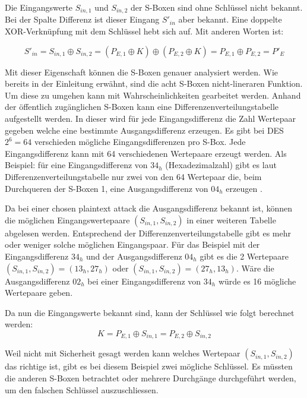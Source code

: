 Die Eingangswerte $S_{in,1}$ und $S_{in,2}$ der S-Boxen sind ohne Schlüssel nicht bekannt. Bei der Spalte \glqq Differenz\grqq{} ist dieser Eingang $S'_{in}$ aber bekannt. Eine doppelte XOR-Verknüpfung mit dem Schlüssel hebt sich auf. Mit anderen Worten ist: 

\begin{equation}\label{equ:Schluessel_Differenz}
S'_{in} = S_{in,1} \oplus S_{in,2} = (P_{E,1} \oplus K) \oplus (P_{E,2} \oplus K) = P_{E,1} \oplus P_{E,2} = P'_{E} 
\end{equation}


Mit dieser Eigenschaft können die S-Boxen genauer analysiert werden. 
Wie bereits in der Einleitung erwähnt, sind die acht S-Boxen nicht-lineraren Funktion. Um diese zu umgehen kann mit Wahrscheinlichkeiten gearbeitet werden.
Anhand der öffentlich zugänglichen S-Boxen kann eine Differenzenverteilungstabelle aufgestellt werden. In dieser wird für jede Eingangsdifferenz die Zahl  Wertepaar gegeben welche eine bestimmte Ausgangsdifferenz erzeugen. 
Es gibt bei DES $2^{6} = 64$ verschieden mögliche Eingangsdifferenzen pro S-Box. Jede Eingangsdifferenz kann mit 64 verschiedenen Wertepaare erzeugt werden. Als Beispiel: für eine Eingangsdifferenz von $34_{h}$ (Hexadezimalzahl) gibt es laut Differenzenverteilungstabelle nur zwei von den 64 Wertepaar die, beim Durchqueren der S-Boxen 1, eine Ausgangsdifferenz von $04_{h}$ erzeugen \cite{noauthor_differenzielle_2019}\cite{biham_differential_1990}. 

Da bei einer chosen plaintext attack die Ausgangsdifferenz bekannt ist, können die möglichen Eingangswertepaare $(S_{in,1}, S_{in,2})$ in einer weiteren Tabelle abgelesen werden. Entsprechend der Differenzenverteilungstabelle gibt es mehr oder weniger solche möglichen Eingangspaar.
Für das Beispiel mit der Eingangsdifferenz $34_{h}$ und der Ausgangsdifferenz $04_{h}$ gibt es die 2 Wertepaare $(S_{in,1}, S_{in,2}) = (13_{h}, 27_{h})$ oder $(S_{in,1},S_{in,2}) = (27_{h}, 13_{h})$. Wäre die Ausgangsdifferenz $02_{h}$ bei einer Eingangsdifferenz von $34_{h}$ würde es 16 mögliche Wertepaare geben. 

Da nun die Eingangswerte bekannt sind, kann der Schlüssel wie folgt berechnet werden:
\begin{equation}\label{equ:Schluessel_Loesung}
K = P_{E,1} \oplus S_{in,1} = P_{E,2} \oplus S_{in,2}
\end{equation}

Weil nicht mit Sicherheit gesagt werden kann welches Wertepaar $(S_{in,1}, S_{in,2})$ das richtige ist, gibt es bei diesem Beispiel zwei mögliche Schlüssel. Es müssten die anderen S-Boxen betrachtet oder mehrere Durchgänge durchgeführt werden, um den falschen Schlüssel auszuschliessen. 

